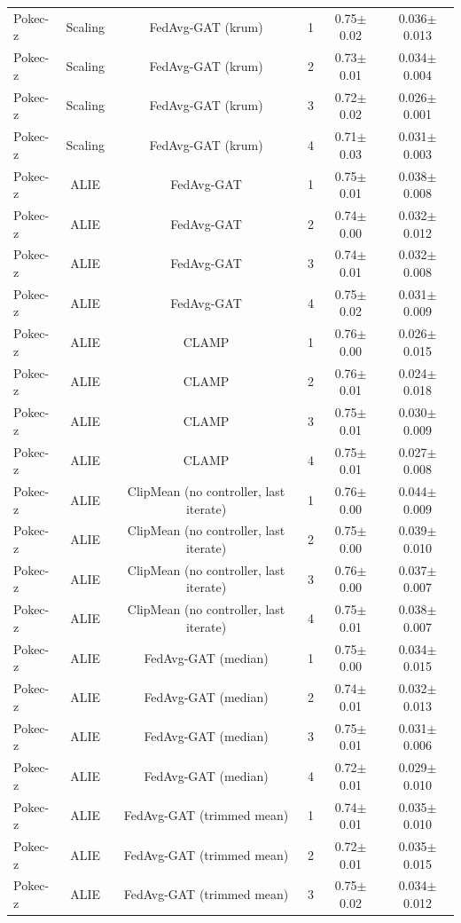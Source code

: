 \begin{table}[tbp]
\begin{tabular}{lccccc}
Pokec-z & Scaling & FedAvg-GAT (krum) & 1 & 0.75$\pm$0.02 & 0.036$\pm$0.013 \\
Pokec-z & Scaling & FedAvg-GAT (krum) & 2 & 0.73$\pm$0.01 & 0.034$\pm$0.004 \\
Pokec-z & Scaling & FedAvg-GAT (krum) & 3 & 0.72$\pm$0.02 & 0.026$\pm$0.001 \\
Pokec-z & Scaling & FedAvg-GAT (krum) & 4 & 0.71$\pm$0.03 & 0.031$\pm$0.003 \\
Pokec-z & ALIE & FedAvg-GAT & 1 & 0.75$\pm$0.01 & 0.038$\pm$0.008 \\
Pokec-z & ALIE & FedAvg-GAT & 2 & 0.74$\pm$0.00 & 0.032$\pm$0.012 \\
Pokec-z & ALIE & FedAvg-GAT & 3 & 0.74$\pm$0.01 & 0.032$\pm$0.008 \\
Pokec-z & ALIE & FedAvg-GAT & 4 & 0.75$\pm$0.02 & 0.031$\pm$0.009 \\
Pokec-z & ALIE & CLAMP & 1 & 0.76$\pm$0.00 & 0.026$\pm$0.015 \\
Pokec-z & ALIE & CLAMP & 2 & 0.76$\pm$0.01 & 0.024$\pm$0.018 \\
Pokec-z & ALIE & CLAMP & 3 & 0.75$\pm$0.01 & 0.030$\pm$0.009 \\
Pokec-z & ALIE & CLAMP & 4 & 0.75$\pm$0.01 & 0.027$\pm$0.008 \\
Pokec-z & ALIE & ClipMean (no controller, last iterate) & 1 & 0.76$\pm$0.00 & 0.044$\pm$0.009 \\
Pokec-z & ALIE & ClipMean (no controller, last iterate) & 2 & 0.75$\pm$0.00 & 0.039$\pm$0.010 \\
Pokec-z & ALIE & ClipMean (no controller, last iterate) & 3 & 0.76$\pm$0.00 & 0.037$\pm$0.007 \\
Pokec-z & ALIE & ClipMean (no controller, last iterate) & 4 & 0.75$\pm$0.01 & 0.038$\pm$0.007 \\
Pokec-z & ALIE & FedAvg-GAT (median) & 1 & 0.75$\pm$0.00 & 0.034$\pm$0.015 \\
Pokec-z & ALIE & FedAvg-GAT (median) & 2 & 0.74$\pm$0.01 & 0.032$\pm$0.013 \\
Pokec-z & ALIE & FedAvg-GAT (median) & 3 & 0.75$\pm$0.01 & 0.031$\pm$0.006 \\
Pokec-z & ALIE & FedAvg-GAT (median) & 4 & 0.72$\pm$0.01 & 0.029$\pm$0.010 \\
Pokec-z & ALIE & FedAvg-GAT (trimmed mean) & 1 & 0.74$\pm$0.01 & 0.035$\pm$0.010 \\
Pokec-z & ALIE & FedAvg-GAT (trimmed mean) & 2 & 0.72$\pm$0.01 & 0.035$\pm$0.015 \\
Pokec-z & ALIE & FedAvg-GAT (trimmed mean) & 3 & 0.75$\pm$0.02 & 0.034$\pm$0.012 \\

\end{tabular}
\end{table}
